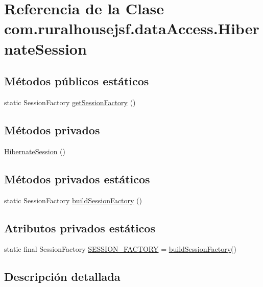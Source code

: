 \hypertarget{a00152}{}\section{Referencia de la Clase com.\+ruralhousejsf.\+data\+Access.\+Hibernate\+Session}
\label{a00152}
\subsection*{Métodos públicos estáticos}
\begin{DoxyCompactItemize}
\item 
static Session\+Factory \mbox{\hyperlink{a00152_ac3420369289a3eb4051f880815d4b5c1}{get\+Session\+Factory}} ()
\end{DoxyCompactItemize}
\subsection*{Métodos privados}
\begin{DoxyCompactItemize}
\item 
\mbox{\hyperlink{a00152_aaa61245491eaeb6fb6e4d5d4fb23273c}{Hibernate\+Session}} ()
\end{DoxyCompactItemize}
\subsection*{Métodos privados estáticos}
\begin{DoxyCompactItemize}
\item 
static Session\+Factory \mbox{\hyperlink{a00152_a54c628cf25032f8511a199671e73820d}{build\+Session\+Factory}} ()
\end{DoxyCompactItemize}
\subsection*{Atributos privados estáticos}
\begin{DoxyCompactItemize}
\item 
static final Session\+Factory \mbox{\hyperlink{a00152_abb795a9ae4989d1caa92621d53529fe1}{S\+E\+S\+S\+I\+O\+N\+\_\+\+F\+A\+C\+T\+O\+RY}} = \mbox{\hyperlink{a00152_a54c628cf25032f8511a199671e73820d}{build\+Session\+Factory}}()
\end{DoxyCompactItemize}


\subsection{Descripción detallada}


